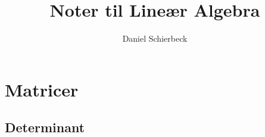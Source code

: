 \documentclass[a4paper]{article}
\title{Noter til Lineær Algebra}
\author{Daniel Schierbeck}
\begin{document}
\maketitle

\section{Matricer}

\subsection{Determinant}
\end{document}

